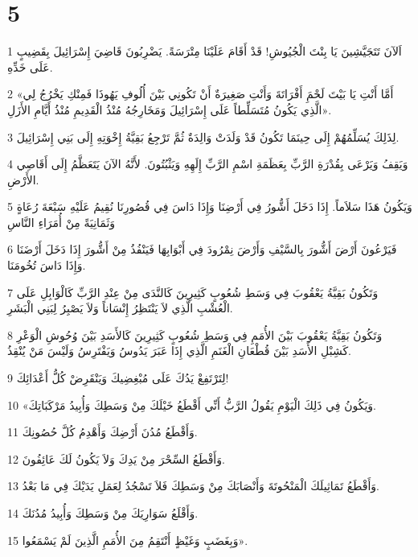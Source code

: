 \chapter{5}

\par 1 اَلآنَ تَتَجَيَّشِينَ يَا بِنْتَ الْجُيُوشِ! قَدْ أَقَامَ عَلَيْنَا مِتْرَسَةً. يَضْرِبُونَ قَاضِيَ إِسْرَائِيلَ بِقَضِيبٍ عَلَى خَدِّهِ.
\par 2 «أَمَّا أَنْتِ يَا بَيْتَ لَحْمَِ أَفْرَاتَةَ وَأَنْتِ صَغِيرَةٌ أَنْ تَكُونِي بَيْنَ أُلُوفِ يَهُوذَا فَمِنْكِ يَخْرُجُ لِي الَّذِي يَكُونُ مُتَسَلِّطاً عَلَى إِسْرَائِيلَ وَمَخَارِجُهُ مُنْذُ الْقَدِيمِ مُنْذُ أَيَّامِ الأَزَلِ».
\par 3 لِذَلِكَ يُسَلِّمُهُمْ إِلَى حِينَمَا تَكُونُ قَدْ وَلَدَتْ وَالِدَةٌ ثُمَّ تَرْجِعُ بَقِيَّةُ إِخْوَتِهِ إِلَى بَنِي إِسْرَائِيلَ.
\par 4 وَيَقِفُ وَيَرْعَى بِقُدْرَةِ الرَّبِّ بِعَظَمَةِ اسْمِ الرَّبِّ إِلَهِهِ وَيَثْبُتُونَ. لأَنَّهُ الآنَ يَتَعَظَّمُ إِلَى أَقَاصِي الأَرْضِ.
\par 5 وَيَكُونُ هَذَا سَلاَماً. إِذَا دَخَلَ أَشُّورُ فِي أَرْضِنَا وَإِذَا دَاسَ فِي قُصُورِنَا نُقِيمُ عَلَيْهِ سَبْعَةَ رُعَاةٍ وَثَمَانِيَةً مِنْ أُمَرَاءِ النَّاسِ
\par 6 فَيَرْعُونَ أَرْضَ أَشُّورَ بِالسَّيْفِ وَأَرْضَ نِمْرُودَ فِي أَبْوَابِهَا فَيَنْفُذُ مِنْ أَشُّورَ إِذَا دَخَلَ أَرْضَنَا وَإِذَا دَاسَ تُخُومَنَا.
\par 7 وَتَكُونُ بَقِيَّةُ يَعْقُوبَ فِي وَسَطِ شُعُوبٍ كَثِيرِينَ كَالنَّدَى مِنْ عِنْدِ الرَّبِّ كَالْوَابِلِ عَلَى الْعُشْبِ الَّذِي لاَ يَنْتَظِرُ إِنْسَاناً وَلاَ يَصْبِرُ لِبَنِي الْبَشَرِ.
\par 8 وَتَكُونُ بَقِيَّةُ يَعْقُوبَ بَيْنَ الأُمَمِ فِي وَسَطِ شُعُوبٍ كَثِيرِينَ كَالأَسَدِ بَيْنَ وُحُوشِ الْوَعْرِ كَشِبْلِ الأَسَدِ بَيْنَ قُطْعَانِ الْغَنَمِ الَّذِي إِذَا عَبَرَ يَدُوسُ وَيَفْتَرِسُ وَلَيْسَ مَنْ يُنْقِذُ.
\par 9 لِتَرْتَفِعْ يَدُكَ عَلَى مُبْغِضِيكَ وَيَنْقَرِضْ كُلُّ أَعْدَائِكَ!
\par 10 «وَيَكُونُ فِي ذَلِكَ الْيَوْمِ يَقُولُ الرَّبُّ أَنِّي أَقْطَعُ خَيْلَكَ مِنْ وَسَطِكَ وَأُبِيدُ مَرْكَبَاتِكَ.
\par 11 وَأَقْطَعُ مُدُنَ أَرْضِكَ وَأَهْدِمُ كُلَّ حُصُونِكَ.
\par 12 وَأَقْطَعُ السِّحْرَ مِنْ يَدِكَ وَلاَ يَكُونُ لَكَ عَائِفُونَ.
\par 13 وَأَقْطَعُ تَمَاثِيلَكَ الْمَنْحُوتَةَ وَأَنْصَابَكَ مِنْ وَسَطِكَ فَلاَ تَسْجُدُ لِعَمَلِ يَدَيْكَ فِي مَا بَعْدُ.
\par 14 وَأَقْلَعُ سَوَارِيَكَ مِنْ وَسَطِكَ وَأُبِيدُ مُدُنَكَ.
\par 15 وَبِغَضَبٍ وَغَيْظٍ أَنْتَقِمُ مِنَ الأُمَمِ الَّذِينَ لَمْ يَسْمَعُوا».

